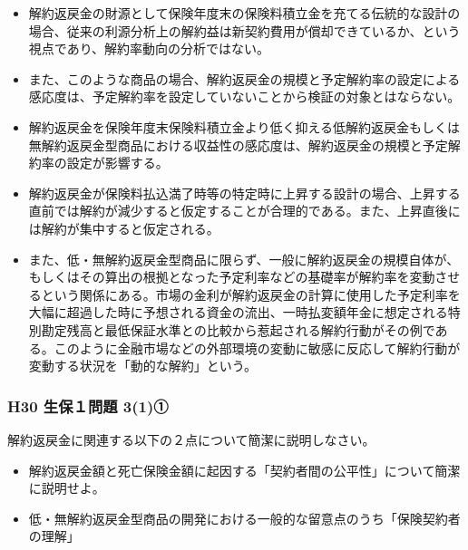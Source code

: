\documentclass[report,gutter=10mm,fore-edge=10mm]{jlreq}
\begin{document}
\begin{enumerate}
\begin{itemize}
      \item 解約返戻金の財源として保険年度末の保険料積立金を充てる伝統的な設計の場合、従来の利源分析上の解約益は新契約費用が償却できているか、という視点であり、解約率動向の分析ではない。
      \item また、このような商品の場合、解約返戻金の規模と予定解約率の設定による感応度は、予定解約率を設定していないことから検証の対象とはならない。
      \item 解約返戻金を保険年度末保険料積立金より低く抑える低解約返戻金もしくは無解約返戻金型商品における収益性の感応度は、解約返戻金の規模と予定解約率の設定が影響する。
      \item 解約返戻金が保険料払込満了時等の特定時に上昇する設計の場合、上昇する直前では解約が減少すると仮定することが合理的である。また、上昇直後には解約が集中すると仮定される。
      \item また、低・無解約返戻金型商品に限らず、一般に解約返戻金の規模自体が、もしくはその算出の根拠となった予定利率などの基礎率が解約率を変動させるという関係にある。市場の金利が解約返戻金の計算に使用した予定利率を大幅に超過した時に予想される資金の流出、一時払変額年金に想定される特別勘定残高と最低保証水準との比較から惹起される解約行動がその例である。このように金融市場などの外部環境の変動に敏感に反応して解約行動が変動する状況を「動的な解約」という。
    \end{itemize}
  \end{enumerate}
\subsubsection{H30 生保１問題 3(1)①}
  解約返戻金に関連する以下の２点について簡潔に説明しなさい。
  \begin{itemize}
    \item 解約返戻金額と死亡保険金額に起因する「契約者間の公平性」について簡潔に説明せよ。
    \item 低・無解約返戻金型商品の開発における一般的な留意点のうち「保険契約者の理解」
  \end{itemize}
  
\end{document}
